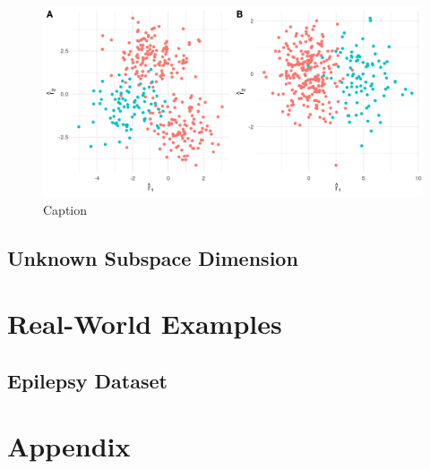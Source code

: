 \documentclass[12pt]{article}
\begin{document}
\begin{figure}
    \centering
    \includegraphics[width=6in]{../results/figures/sim_rvs.png}
    \caption{Caption}
    \label{fig:sim_rvs}
\end{figure}

\subsection{Unknown Subspace Dimension}


\section{Real-World Examples}


\subsection{Epilepsy Dataset}


\section*{Appendix}




\end{document}
